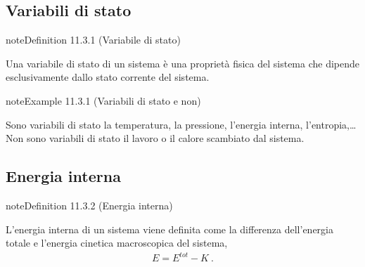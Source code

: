 \documentclass[letterpaper,10pt,italian]{jupyterBook}
\begin{document}
\subsection{Variabili di stato}
\label{\detokenize{ch/thermodynamics/principles-gibbs-phase-rule:variabili-di-stato}}\label{\detokenize{ch/thermodynamics/principles-gibbs-phase-rule:physics-hs-thermodynamics-foundation-principles-gibbs-phase-rule-state-vars}}\label{ch/thermodynamics/principles-gibbs-phase-rule:definition-0}
\begin{sphinxadmonition}{note}{Definition 11.3.1 (Variabile di stato)}



\sphinxAtStartPar
Una variabile di stato di un sistema è una proprietà fisica del sistema che dipende esclusivamente dallo stato corrente del sistema.
\end{sphinxadmonition}
\label{ch/thermodynamics/principles-gibbs-phase-rule:example-1}
\begin{sphinxadmonition}{note}{Example 11.3.1 (Variabili di stato e non)}



\sphinxAtStartPar
Sono variabili di stato la temperatura, la pressione, l’energia interna, l’entropia,…
Non sono variabili di stato il lavoro o il calore scambiato dal sistema. 
\end{sphinxadmonition}


\subsection{Energia interna}
\label{\detokenize{ch/thermodynamics/principles-gibbs-phase-rule:energia-interna}}\label{\detokenize{ch/thermodynamics/principles-gibbs-phase-rule:physics-hs-thermodynamics-foundation-principles-gibbs-phase-rule-internal-energy}}\label{ch/thermodynamics/principles-gibbs-phase-rule:definition-2}
\begin{sphinxadmonition}{note}{Definition 11.3.2 (Energia interna)}



\sphinxAtStartPar
L’energia interna di un sistema viene definita come la differenza dell’energia totale e l’energia cinetica macroscopica del sistema,
\begin{equation*}
\begin{split}E = E^{tot} - K \ .\end{split}
\end{equation*}\end{sphinxadmonition}
\end{document}
